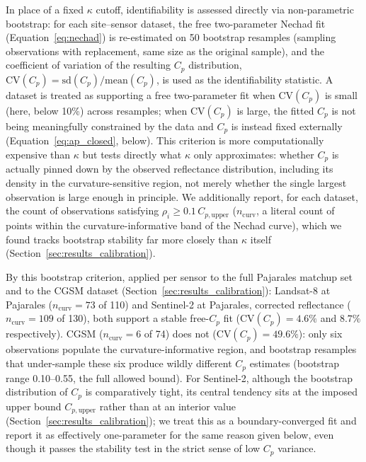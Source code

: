 \documentclass[remotesensing,article,submit,pdftex,moreauthors]{Definitions/mdpi}
\begin{document}
In place of a fixed $\kappa$ cutoff, identifiability is assessed
directly via non-parametric bootstrap: for each site--sensor dataset,
the free two-parameter Nechad fit
(Equation~\ref{eq:nechad}) is re-estimated on 50 bootstrap resamples
(sampling observations with replacement, same size as the original
sample), and the coefficient of variation of the resulting $C_p$
distribution, $\mathrm{CV}(C_p) = \mathrm{sd}(C_p)/\mathrm{mean}(C_p)$,
is used as the identifiability statistic. A dataset is treated as
supporting a free two-parameter fit when $\mathrm{CV}(C_p)$ is small
(here, below 10\%) across resamples; when $\mathrm{CV}(C_p)$ is large,
the fitted $C_p$ is not being meaningfully constrained by the data and
$C_p$ is instead fixed externally
(Equation~\ref{eq:ap_closed}, below). This criterion is more
computationally expensive than $\kappa$ but tests directly what
$\kappa$ only approximates: whether $C_p$ is actually pinned down by
the observed reflectance distribution, including its density in the
curvature-sensitive region, not merely whether the single largest
observation is large enough in principle. We additionally report, for
each dataset, the count of observations satisfying
$\rho_i \geq 0.1\,C_{p,\text{upper}}$ ($n_{\text{curv}}$, a literal
count of points within the curvature-informative band of the Nechad
curve), which we found tracks bootstrap stability far more closely
than $\kappa$ itself (Section~\ref{sec:results_calibration}).
 
By this bootstrap criterion, applied per sensor to the full Pajarales
matchup set and to the CGSM dataset
(Section~\ref{sec:results_calibration}): Landsat-8 at Pajarales
($n_{\text{curv}} = 73$ of 110) and Sentinel-2 at Pajarales, corrected
reflectance ($n_{\text{curv}} = 109$ of 130), both support a stable
free-$C_p$ fit ($\mathrm{CV}(C_p) = 4.6\%$ and $8.7\%$ respectively).
CGSM ($n_{\text{curv}} = 6$ of 74) does not
($\mathrm{CV}(C_p) = 49.6\%$): only six observations populate the
curvature-informative region, and bootstrap resamples that under-sample
these six produce wildly different $C_p$ estimates (bootstrap range
0.10--0.55, the full allowed bound). For Sentinel-2, although the
bootstrap distribution of $C_p$ is comparatively tight, its central
tendency sits at the imposed upper bound $C_{p,\text{upper}}$ rather
than at an interior value (Section~\ref{sec:results_calibration}); we
treat this as a boundary-converged fit and report it as effectively
one-parameter for the same reason given below, even though it passes
the stability test in the strict sense of low $C_p$ variance.
 
\end{document}
